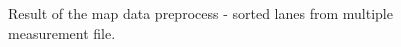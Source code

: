 \documentclass[sn-mathphys-num]{sn-jnl}%
\begin{document}
\begin{figure}[h]
    \caption{Result of the map data preprocess - sorted lanes from multiple measurement file.}
    \label{fig:ZZ_all}
\end{figure}
\end{document}
